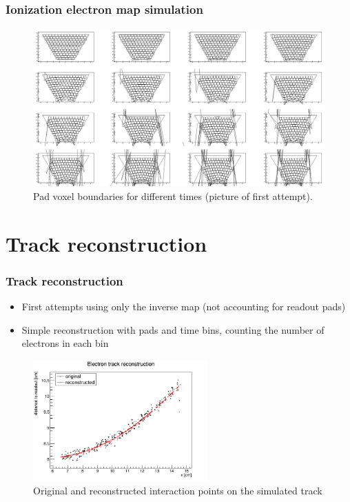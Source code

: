 \documentclass{beamer}
\begin{document}
	\begin{frame}
		\frametitle{Ionization electron map simulation}
		\begin{figure}
			\centering
			\includegraphics[height=0.68\textheight]{../images/pads_dist.png}
			\caption{Pad voxel boundaries for different times (picture of first attempt).}
		\end{figure}
	\end{frame}


	\section{Track reconstruction}
	\begin{frame}
		\frametitle{Track reconstruction}
		\begin{itemize}
			\item First attempts using only the inverse map (not accounting for readout pads)
			\item Simple reconstruction with pads and time bins, counting the number of electrons in each bin
		\end{itemize}
		\begin{figure}
			\centering
			\includegraphics[width=0.6\textwidth]{../images/reco_track.png}
			\caption{Original and reconstructed interaction points on the simulated track}
		\end{figure}
	\end{frame}
\end{document}
